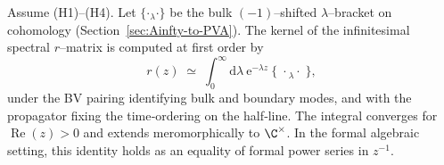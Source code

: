 \begin{proposition}
Assume \textrm{(H1)--(H4)}.
Let $\{\cdot{}_\lambda \cdot\}$ be the bulk $(-1)$–shifted $\lambda$–bracket on cohomology (Section~\ref{sec:Ainfty-to-PVA}). The kernel of the infinitesimal spectral $r$–matrix is computed at first order by
\[
r(z) \;\simeq\; \int_{0}^{\infty} \! \mathrm{d}\lambda\ \mathrm{e}^{-\lambda z}\ \bigl\{\; \cdot {}_\lambda \cdot \;\bigr\},
\]
under the BV pairing identifying bulk and boundary modes, and with the propagator fixing the time‑ordering on the half‑line. The integral converges for $\operatorname{Re}(z) > 0$ and extends meromorphically to $\C^\times$. In the formal algebraic setting, this identity holds as an equality of formal power series in $z^{-1}$.
\end{proposition}

